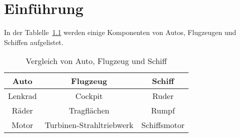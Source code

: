 \documentclass[12pt,a4paper]{scrbook}
\begin{document}
\chapter{Einführung}
In der Tablelle~\ref{VergleichAFS} werden einige Komponenten von Autos, Flugzeugen und Schiffen aufgelistet.
    
\begin{table}[htb]
\centering  
\begin{tabular}{|c|c|c|}
	Auto    & Flugzeug    & Schiff \\ \hline
	Lenkrad & Cockpit     & Ruder \\
	Räder   & Tragflächen & Rumpf \\
	Motor   & Turbinen-Strahltriebwerk & Schiffsmotor \\
\end{tabular}
\caption{Vergleich von Auto, Flugzeug und Schiff}
\label{VergleichAFS}
\end{table}    
\end{document}
